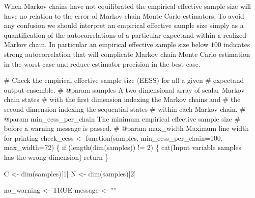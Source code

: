 \documentclass[
  letterpaper,
  DIV=11,
  numbers=noendperiod]{scrartcl}
\newenvironment{Shaded}{\begin{snugshade}}{\end{snugshade}}
\newcommand{\AttributeTok}[1]{\textcolor[rgb]{0.40,0.45,0.13}{#1}}
\newcommand{\CommentTok}[1]{\textcolor[rgb]{0.37,0.37,0.37}{#1}}
\newcommand{\ConstantTok}[1]{\textcolor[rgb]{0.56,0.35,0.01}{#1}}
\newcommand{\ControlFlowTok}[1]{\textcolor[rgb]{0.00,0.23,0.31}{#1}}
\newcommand{\DecValTok}[1]{\textcolor[rgb]{0.68,0.00,0.00}{#1}}
\newcommand{\FunctionTok}[1]{\textcolor[rgb]{0.28,0.35,0.67}{#1}}
\newcommand{\NormalTok}[1]{\textcolor[rgb]{0.00,0.23,0.31}{#1}}
\newcommand{\OtherTok}[1]{\textcolor[rgb]{0.00,0.23,0.31}{#1}}
\newcommand{\SpecialCharTok}[1]{\textcolor[rgb]{0.37,0.37,0.37}{#1}}
\newcommand{\StringTok}[1]{\textcolor[rgb]{0.13,0.47,0.30}{#1}}
\begin{document}
When Markov chains have not equilibrated the empirical effective sample
size will have no relation to the error of Markov chain Monte Carlo
estimators. To avoid any confusion we should interpret an empirical
effective sample size simply as a quantification of the autocorrelations
of a particular expectand within a realized Markov chain. In particular
an empirical effective sample size below \(100\) indicates strong
autocorrelation that will complicate Markov chain Monte Carlo estimation
in the worst case and reduce estimator precision in the best case.

\begin{Shaded}
\begin{Highlighting}[]
\CommentTok{\# Check the empirical effective sample size (EESS) for all a given }
\CommentTok{\# expectand output ensemble.}
\CommentTok{\# @param samples A two{-}dimensional array of scalar Markov chain states }
\CommentTok{\#                with the first dimension indexing the Markov chains and }
\CommentTok{\#                the second dimension indexing the sequential states }
\CommentTok{\#                within each Markov chain.}
\CommentTok{\# @param min\_eess\_per\_chain The minimum empirical effective sample size}
\CommentTok{\#                           before a warning message is passed.}
\CommentTok{\# @param max\_width Maximum line width for printing}
\NormalTok{check\_eess }\OtherTok{\textless{}{-}} \ControlFlowTok{function}\NormalTok{(samples,}
                       \AttributeTok{min\_eess\_per\_chain=}\DecValTok{100}\NormalTok{,}
                       \AttributeTok{max\_width=}\DecValTok{72}\NormalTok{) \{}
  \ControlFlowTok{if}\NormalTok{ (}\FunctionTok{length}\NormalTok{(}\FunctionTok{dim}\NormalTok{(samples)) }\SpecialCharTok{!=} \DecValTok{2}\NormalTok{) \{}
    \FunctionTok{cat}\NormalTok{(}\StringTok{\textquotesingle{}Input variable \textasciigrave{}samples\textasciigrave{} has the wrong dimension\textquotesingle{}}\NormalTok{)}
\NormalTok{    return}
\NormalTok{  \}}
  
\NormalTok{  C }\OtherTok{\textless{}{-}} \FunctionTok{dim}\NormalTok{(samples)[}\DecValTok{1}\NormalTok{]}
\NormalTok{  N }\OtherTok{\textless{}{-}} \FunctionTok{dim}\NormalTok{(samples)[}\DecValTok{2}\NormalTok{]}
  
\NormalTok{  no\_warning }\OtherTok{\textless{}{-}} \ConstantTok{TRUE}
\NormalTok{  message }\OtherTok{\textless{}{-}} \StringTok{""}
  

\end{Highlighting}
\end{Shaded}
\end{document}
